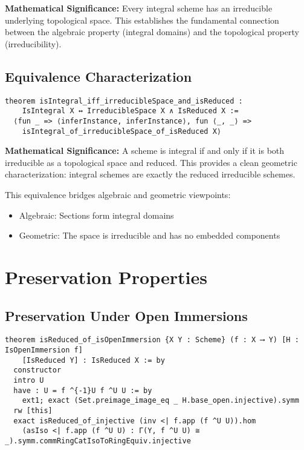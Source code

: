 \documentclass{article}
\theoremstyle{definition}
\begin{document}
\textbf{Mathematical Significance:} Every integral scheme has an irreducible underlying topological space. This establishes the fundamental connection between the algebraic property (integral domains) and the topological property (irreducibility).

\subsection{Equivalence Characterization}

\begin{lstlisting}
theorem isIntegral_iff_irreducibleSpace_and_isReduced :
    IsIntegral X ↔ IrreducibleSpace X ∧ IsReduced X :=
  ⟨fun _ => ⟨inferInstance, inferInstance⟩, fun ⟨_, _⟩ =>
    isIntegral_of_irreducibleSpace_of_isReduced X⟩
\end{lstlisting}

\textbf{Mathematical Significance:} A scheme is integral if and only if it is both irreducible as a topological space and reduced. This provides a clean geometric characterization: integral schemes are exactly the reduced irreducible schemes.

This equivalence bridges algebraic and geometric viewpoints:
\begin{itemize}
\item Algebraic: Sections form integral domains
\item Geometric: The space is irreducible and has no embedded components
\end{itemize}

\section{Preservation Properties}

\subsection{Preservation Under Open Immersions}

\begin{lstlisting}
theorem isReduced_of_isOpenImmersion {X Y : Scheme} (f : X ⟶ Y) [H : IsOpenImmersion f]
    [IsReduced Y] : IsReduced X := by
  constructor
  intro U
  have : U = f ^{-1}U f ^U U := by
    ext1; exact (Set.preimage_image_eq _ H.base_open.injective).symm
  rw [this]
  exact isReduced_of_injective (inv <| f.app (f ^U U)).hom
    (asIso <| f.app (f ^U U) : Γ(Y, f ^U U) ≅ _).symm.commRingCatIsoToRingEquiv.injective
\end{lstlisting}
\end{document}
